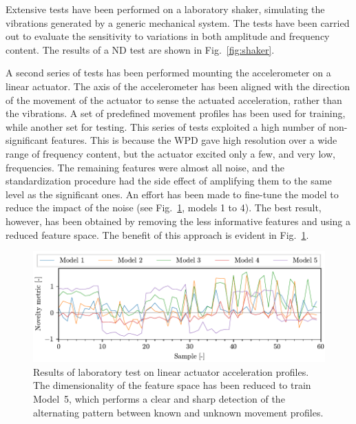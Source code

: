 Extensive tests have been performed on a laboratory shaker, simulating the vibrations generated by a generic mechanical system. The tests have been carried out to evaluate the sensitivity to variations in both amplitude and frequency content. The results of a ND test are shown in Fig.~\ref{fig:shaker}.

A second series of tests has been performed mounting the accelerometer on a linear actuator. The axis of the accelerometer has been aligned with the direction of the movement of the actuator to sense the actuated acceleration, rather than the vibrations. A set of predefined movement profiles has been used for training, while another set for testing. This series of tests exploited a high number of non-significant features. This is because the WPD gave high resolution over a wide range of frequency content, but the actuator excited only a few, and very low, frequencies. The remaining features were almost all noise, and the standardization procedure had the side effect of amplifying them to the same level as the significant ones. An effort has been made to fine-tune the model to reduce the impact of the noise (see Fig.~\ref{fig:linear}, models 1 to 4). The best result, however, has been obtained by removing the less informative features and using a reduced feature space. The benefit of this approach is evident in Fig.~\ref{fig:linear}.


\begin{figure}
    \includegraphics[width=\linewidth]{images/linear.pdf}
    \caption{Results of laboratory test on linear actuator acceleration profiles. The dimensionality of the feature space has been reduced to train Model~5, which performs a clear and sharp detection of the alternating pattern between known and unknown movement profiles.}
    \label{fig:linear}
\end{figure}